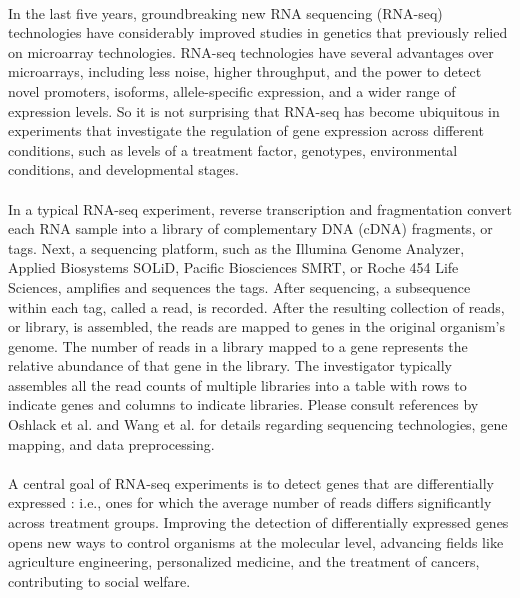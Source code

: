 \documentclass[10pt]{article}
\begin{document}
\paragraph{} \indent In the last five years, groundbreaking new RNA sequencing (RNA-seq) technologies have considerably improved studies in genetics that previously relied on microarray technologies. RNA-seq technologies have several advantages over microarrays, including less noise, higher throughput, and the power to detect novel promoters, isoforms, allele-specific expression, and a wider range of expression levels. So it is not surprising that RNA-seq has become ubiquitous in experiments that investigate the regulation of gene expression across different conditions, such as levels of a treatment factor, genotypes, environmental conditions, and developmental stages.

\paragraph{} \indent In a typical RNA-seq experiment, reverse transcription and fragmentation convert each RNA sample into a library of complementary DNA (cDNA) fragments, or tags. Next, a sequencing platform, such as the Illumina Genome Analyzer, Applied Biosystems SOLiD, Pacific Biosciences SMRT, or Roche 454 Life Sciences, amplifies and sequences the tags. After sequencing, a subsequence within each tag, called a read, is recorded. After the resulting collection of reads, or library, is assembled, the reads are mapped to genes in the original organism's genome. The number of reads in a library mapped to a gene represents the relative abundance of that gene in the library. The investigator typically assembles all the read counts of multiple libraries into a table with rows to indicate genes and columns to indicate libraries. Please consult references by Oshlack et al. \cite{oshlack} and Wang et al. \cite{wang} for details regarding sequencing technologies, gene mapping, and data preprocessing.

\paragraph{} \indent A central goal of RNA-seq experiments is to detect genes that are differentially expressed %
: i.e., ones for which the average number of reads differs significantly across treatment groups. Improving the detection of differentially expressed genes opens new ways to control organisms at the molecular level, advancing fields like agriculture engineering, personalized medicine, and the treatment of cancers, contributing to social welfare.
\end{document}
